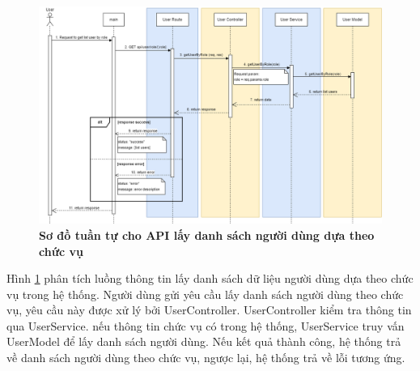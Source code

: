\begin{figure}[H]
  \centering
  \includegraphics[scale=0.4]{Images/sequence_api/getUserByRole.png}
  \caption[Sơ đồ tuần tự cho API lấy danh sách người dùng dựa theo chức vụ ]{\bfseries \fontsize{12pt}{0pt}
  \selectfont Sơ đồ tuần tự cho API lấy danh sách người dùng dựa theo chức vụ }
  \label{api_getUserByRole} %
\end{figure}
Hình \ref{api_getUserByRole} phân tích luồng thông tin lấy danh sách dữ liệu người dùng dựa theo chức vụ trong hệ thống. Người dùng gửi yêu cầu lấy danh sách người dùng theo chức vụ, yêu cầu này được xử lý bởi UserController. UserController kiểm tra thông tin qua UserService. nếu thông tin 
chức vụ có trong hệ thống, UserService truy vấn UserModel để lấy danh sách người dùng. Nếu kết quả thành công, hệ thống trả về danh sách người dùng theo chức vụ, ngược lại, hệ thống trả về lỗi tương ứng.

